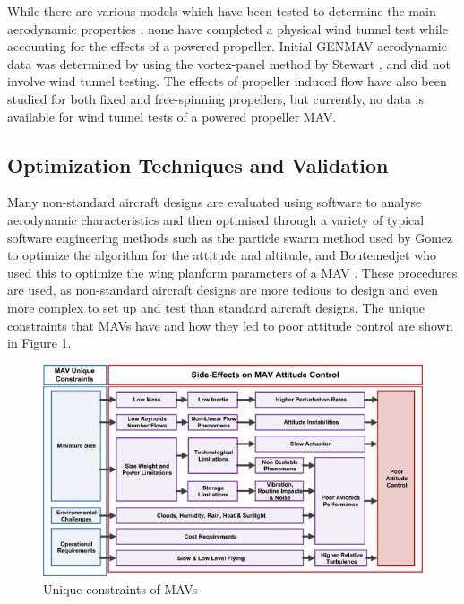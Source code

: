 While there are various models which have been tested to determine the main aerodynamic properties \cite{Stewart2007} \cite{Aboelezz2020}, none have completed a physical wind tunnel test while accounting for the effects of a powered propeller. Initial GENMAV aerodynamic data was determined by using the vortex-panel method by Stewart \cite{Stewart2007}, and did not involve wind tunnel testing. The effects of propeller induced flow have also been studied for both fixed and free-spinning propellers, but currently, no data is available for wind tunnel tests of a powered propeller MAV.

\subsection{Optimization Techniques and Validation}
\label{subsec:Optimization}
Many non-standard aircraft designs are evaluated using software to analyse aerodynamic characteristics and then optimised through a variety of typical software engineering methods such as the particle swarm method used by Gomez to optimize the algorithm for the attitude and altitude, and Boutemedjet who used this to optimize the wing planform parameters of a MAV \cite{Gomez2020, Boutemedjet2019}. These procedures are used, as non-standard aircraft designs are more tedious to design and even more complex to set up and test than standard aircraft designs. The unique constraints that MAVs have and how they led to poor attitude control are shown in Figure \ref{fig:MAVconstrain}.

\begin{figure}[H]
  \centering
   \includegraphics[width=\linewidth]{03_LiteratureReview/Figs/fowchart.jpg}
  \caption{Unique constraints of MAVs \cite{Mohamed2014}}
  \label{fig:MAVconstrain}
\end{figure}

